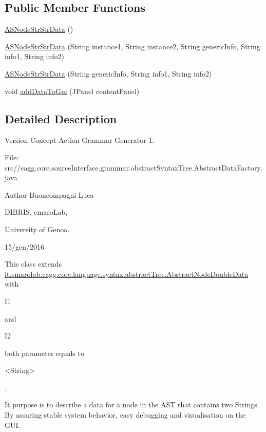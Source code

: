 \subsection*{Public Member Functions}
\begin{DoxyCompactItemize}
\item 
\hyperlink{classit_1_1emarolab_1_1cagg_1_1core_1_1language_1_1syntax_1_1abstractTree_1_1AbstractDataFactory_1_1ASNodeStrStrData_aa745854a797704ae7ea26ea7c4206c53}{A\-S\-Node\-Str\-Str\-Data} ()
\item 
\hyperlink{classit_1_1emarolab_1_1cagg_1_1core_1_1language_1_1syntax_1_1abstractTree_1_1AbstractDataFactory_1_1ASNodeStrStrData_a169581a4a98a57bd6777dc4e5cb6cb1d}{A\-S\-Node\-Str\-Str\-Data} (String instance1, String instance2, String generic\-Info, String info1, String info2)
\item 
\hyperlink{classit_1_1emarolab_1_1cagg_1_1core_1_1language_1_1syntax_1_1abstractTree_1_1AbstractDataFactory_1_1ASNodeStrStrData_a88902528c5a1e018fbb9d94946f2ef4c}{A\-S\-Node\-Str\-Str\-Data} (String generic\-Info, String info1, String info2)
\item 
void \hyperlink{classit_1_1emarolab_1_1cagg_1_1core_1_1language_1_1syntax_1_1abstractTree_1_1AbstractDataFactory_1_1ASNodeStrStrData_aa2ffecf6e30b687a844162d436576889}{add\-Data\-To\-Gui} (J\-Panel content\-Panel)
\end{DoxyCompactItemize}


\subsection{Detailed Description}
\begin{DoxyVersion}{Version}
Concept-\/\-Action Grammar Generator 1. \par
 File\-: src//cagg.core.\-source\-Interface.\-grammar.\-abstract\-Syntax\-Tree.\-Abstract\-Data\-Factory.\-java \par

\end{DoxyVersion}
\begin{DoxyAuthor}{Author}
Buoncompagni Luca \par
 D\-I\-B\-R\-I\-S, emaro\-Lab,\par
 University of Genoa. \par
 15/gen/2016 \par

\end{DoxyAuthor}


This class extends \hyperlink{}{it.\-emarolab.\-cagg.\-core.\-language.\-syntax.\-abstract\-Tree.\-Abstract\-Node\-Double\-Data} with
\begin{DoxyCode}
I1 
\end{DoxyCode}
 and
\begin{DoxyCode}
I2 
\end{DoxyCode}
 both parameter equals to
\begin{DoxyCode}
<String> 
\end{DoxyCode}
 .\par
 It purpose is to describe a data for a node in the A\-S\-T that contains two Strings. By assuring stable system behavior, easy debugging and visualisation on the G\-U\-I. 

